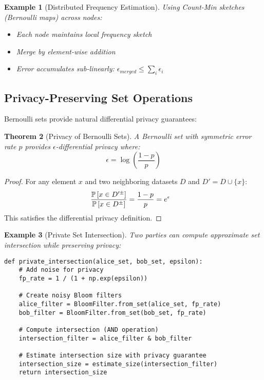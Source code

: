\documentclass[11pt,final,hidelinks]{article}
\newtheorem{theorem}{Theorem}[section]
\newtheorem{example}[theorem]{Example}
\newcommand{\setpm}[1]{#1^{\pm}} %
\newcommand{\ASet}[1]{\setpm{#1}}  %
\begin{document}
\begin{example}[Distributed Frequency Estimation]
Using Count-Min sketches (Bernoulli maps) across nodes:
\begin{itemize}
    \item Each node maintains local frequency sketch
    \item Merge by element-wise addition
    \item Error accumulates sub-linearly: $\epsilon_{merged} \leq \sum_i \epsilon_i$
\end{itemize}
\end{example}

\subsection{Privacy-Preserving Set Operations}

Bernoulli sets provide natural differential privacy guarantees:

\begin{theorem}[Privacy of Bernoulli Sets]
A Bernoulli set with symmetric error rate $p$ provides $\epsilon$-differential privacy where:
\begin{equation}
\epsilon = \log\left(\frac{1-p}{p}\right)
\end{equation}
\end{theorem}

\begin{proof}
For any element $x$ and two neighboring datasets $D$ and $D' = D \cup \{x\}$:
\begin{align}
\frac{\Prob{x \in \ASet{D'}}}{\Prob{x \in \ASet{D}}} &= \frac{1-p}{p} = e^\epsilon
\end{align}
This satisfies the differential privacy definition.
\end{proof}

\begin{example}[Private Set Intersection]
Two parties can compute approximate set intersection while preserving privacy:
\begin{verbatim}
def private_intersection(alice_set, bob_set, epsilon):
    # Add noise for privacy
    fp_rate = 1 / (1 + np.exp(epsilon))
    
    # Create noisy Bloom filters
    alice_filter = BloomFilter.from_set(alice_set, fp_rate)
    bob_filter = BloomFilter.from_set(bob_set, fp_rate)
    
    # Compute intersection (AND operation)
    intersection_filter = alice_filter & bob_filter
    
    # Estimate intersection size with privacy guarantee
    intersection_size = estimate_size(intersection_filter)
    return intersection_size
\end{verbatim}
\end{example}
\end{document}
